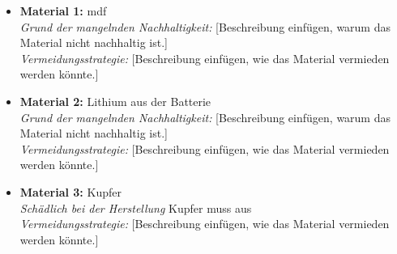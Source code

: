 \begin{itemize}
    \item \textbf{Material 1:} \acrfull{mdf} \\
          \textit{Grund der mangelnden Nachhaltigkeit:} [Beschreibung einfügen, warum das Material nicht nachhaltig ist.] \\
          \textit{Vermeidungsstrategie:} [Beschreibung einfügen, wie das Material vermieden werden könnte.]
    \item \textbf{Material 2:} Lithium aus der Batterie \\
          \textit{Grund der mangelnden Nachhaltigkeit:} [Beschreibung einfügen, warum das Material nicht nachhaltig ist.] \\
          \textit{Vermeidungsstrategie:} [Beschreibung einfügen, wie das Material vermieden werden könnte.]
    \item \textbf{Material 3:} Kupfer \\
          \textit{Schädlich bei der Herstellung} Kupfer muss aus  \\
          \textit{Vermeidungsstrategie:} [Beschreibung einfügen, wie das Material vermieden werden könnte.]
\end{itemize}